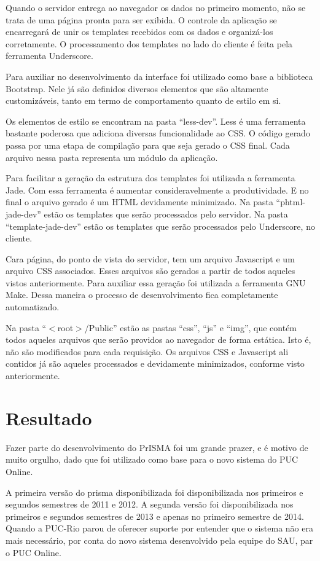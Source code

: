 \documentclass[graduacao,brazil]{ThesisPUC}
\begin{document}
Quando o servidor entrega ao navegador os dados no primeiro momento, não se trata de uma página pronta para ser exibida. O controle da aplicação se encarregará de unir os templates recebidos com os dados e organizá-los corretamente. O processamento dos templates no lado do cliente é feita pela ferramenta Underscore.

Para auxiliar no desenvolvimento da interface foi utilizado como base a biblioteca Bootstrap. Nele já são definidos diversos elementos que são altamente customizáveis, tanto em termo de comportamento quanto de estilo em si.

Os elementos de estilo se encontram na pasta “less-dev”. Less é uma ferramenta bastante poderosa que adiciona diversas funcionalidade ao CSS. O código gerado passa por uma etapa de compilação para que seja gerado o CSS final. Cada arquivo nessa pasta representa um módulo da aplicação.

Para facilitar a geração da estrutura dos templates foi utilizada a ferramenta Jade. Com essa ferramenta é aumentar consideravelmente a produtividade. E no final o arquivo gerado é um HTML devidamente minimizado. Na pasta “phtml-jade-dev” estão os templates que serão processados pelo servidor. Na pasta “template-jade-dev” estão os templates que serão processados pelo Underscore, no cliente.

Cara página, do ponto de vista do servidor, tem um arquivo Javascript e um arquivo CSS associados. Esses arquivos são gerados a partir de todos aqueles vistos anteriormente. Para auxiliar essa geração foi utilizada a ferramenta GNU Make. Dessa maneira o processo de desenvolvimento fica completamente automatizado.

Na pasta “$<$root$>$/Public” estão as pastas “css”, “js” e “img”, que contém todos aqueles arquivos que serão providos ao navegador de forma estática. Isto é, não são modificados para cada requisição. Os arquivos CSS e Javascript ali contidos já são aqueles processados e devidamente minimizados, conforme visto anteriormente.

\chapter{Resultado}

Fazer parte do desenvolvimento do PrISMA foi um grande prazer, e é motivo de muito orgulho, dado que foi utilizado como base para o novo sistema do PUC Online.

A primeira versão do prisma disponibilizada foi disponibilizada nos primeiros e segundos semestres de 2011 e 2012. A segunda versão foi disponibilizada nos primeiros e segundos semestres de 2013 e apenas no primeiro semestre de 2014. Quando a PUC-Rio parou de oferecer suporte por entender que o sistema não era mais necessário, por conta do novo sistema desenvolvido pela equipe do SAU, par o PUC Online.
\end{document}
